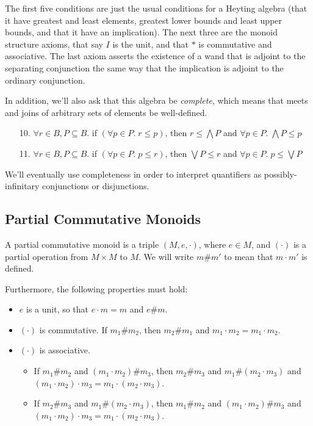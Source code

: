 The first five conditions are just the usual conditions for a Heyting
algebra (that it have greatest and least elements, greatest lower
bounds and least upper bounds, and that it have an implication). The
next three are the monoid structure axioms, that say $I$ is the unit,
and that $*$ is commutative and associative. The last axiom asserts
the existence of a wand that is adjoint to the separating conjunction
the same way that the implication is adjoint to the ordinary
conjunction.

In addition, we'll also ask that this algebra be \emph{complete},
which means that meets and joins of arbitrary sets of elements be
well-defined.

\begin{enumerate}
\item[10.] $\forall r\in B, P \subseteq B.$ if $(\forall p \in P.\; r \leq p)$, then  
      $r \leq \bigwedge P $ and 
      $\forall p \in P.\; \bigwedge P \leq p$
\item[11.] $\forall r \in B, P \subseteq B.$ if $(\forall p \in P.\; p \leq r)$, then  
      $\bigvee P \leq r$ and 
      $\forall p \in P.\; p \leq \bigvee P$
\end{enumerate}

We'll eventually use completeness in order to interpret quantifiers as 
possibly-infinitary conjunctions or disjunctions. 


\subsection{Partial Commutative Monoids}

A partial commutative monoid is a triple $(M, e, \cdot)$, where $e \in
M$, and $(\cdot)$ is a partial operation from $M \times M$ to $M$. We
will write $m \# m'$ to mean that $m \cdot m'$ is defined. 

Furthermore, the following properties must hold:

\begin{itemize}
\item $e$ is a unit, so that $e \cdot m = m$ and $e \# m$. 
\item $(\cdot)$ is commutative. If $m_1 \# m_2$, then $m_2 \# m_1$ and $m_1 \cdot m_2 = m_1 \cdot m_2$. 
\item $(\cdot)$ is associative. 
  \begin{itemize}
  \item If $m_1 \# m_2$ and $(m_1 \cdot m_2) \# m_3$, then $m_2 \# m_3$ and $m_1 \# (m_2 \cdot m_3)$ and $(m_1 \cdot m_2) \cdot m_3 = m_1 \cdot (m_2 \cdot m_3)$.
  \item If $m_2 \# m_3$ and $m_1 \# (m_2 \cdot m_3)$, then $m_1 \# m_2$ and $(m_1 \cdot m_2) \# m_3$ and $(m_1 \cdot m_2) \cdot m_3 = m_1 \cdot (m_2 \cdot m_3)$.
  \end{itemize}
  
  
\end{itemize}

